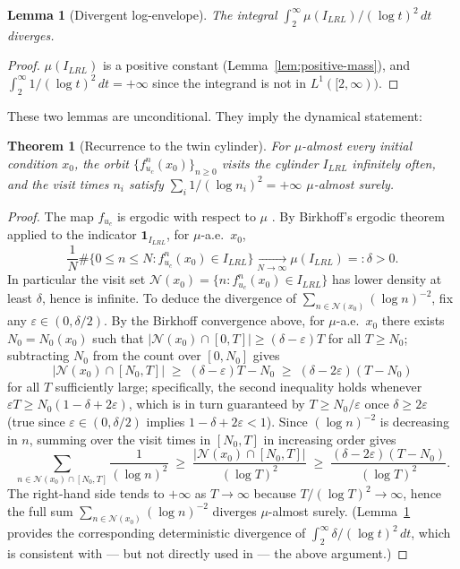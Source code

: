 \documentclass[11pt,a4paper]{article}
\newtheorem{theorem}{Theorem}
\newtheorem{lemma}{Lemma}
\theoremstyle{definition}
\begin{document}
\begin{lemma}[Divergent log-envelope]
\label{lem:divergent-envelope}
The integral $\int_2^\infty \mu(I_{LRL}) / (\log t)^2 \, dt$ diverges.
\end{lemma}
\begin{proof}
$\mu(I_{LRL})$ is a positive constant (Lemma~\ref{lem:positive-mass}),
and $\int_2^\infty 1/(\log t)^2 \, dt = +\infty$ since the integrand is
not in $L^1([2, \infty))$.
\end{proof}

These two lemmas are unconditional. They imply the dynamical statement:

\begin{theorem}[Recurrence to the twin cylinder]
\label{thm:dynamical-recurrence}
For $\mu$-almost every initial condition $x_0$, the orbit
$\{f_{u_c}^n(x_0)\}_{n \geq 0}$ visits the cylinder $I_{LRL}$ infinitely
often, and the visit times $n_i$ satisfy $\sum_i 1/(\log n_i)^2 = +\infty$
$\mu$-almost surely.
\end{theorem}
\begin{proof}
The map $f_{u_c}$ is ergodic with respect to $\mu$
\cite{misiurewicz1981absolutely}. By Birkhoff's ergodic theorem applied
to the indicator $\mathbf{1}_{I_{LRL}}$, for $\mu$-a.e.\ $x_0$,
\[
    \frac{1}{N} \#\{ 0 \leq n \leq N : f_{u_c}^n(x_0) \in I_{LRL} \}
    \xrightarrow[N \to \infty]{} \mu(I_{LRL}) =: \delta > 0.
\]
In particular the visit set
$\mathcal{N}(x_0) = \{ n : f_{u_c}^n(x_0) \in I_{LRL}\}$ has lower
density at least $\delta$, hence is infinite. To deduce the divergence
of $\sum_{n \in \mathcal{N}(x_0)} (\log n)^{-2}$, fix any
$\varepsilon \in (0, \delta/2)$. By the Birkhoff convergence above,
for $\mu$-a.e.\ $x_0$ there exists $N_0 = N_0(x_0)$ such that
$|\mathcal{N}(x_0) \cap [0, T]| \geq (\delta - \varepsilon) T$ for all
$T \geq N_0$; subtracting $N_0$ from the count over $[0, N_0]$ gives
\[
    |\mathcal{N}(x_0) \cap [N_0, T]|
    \;\geq\; (\delta - \varepsilon) T - N_0
    \;\geq\; (\delta - 2\varepsilon)(T - N_0)
\]
for all $T$ sufficiently large; specifically, the second inequality
holds whenever $\varepsilon T \geq N_0 (1 - \delta + 2\varepsilon)$,
which is in turn guaranteed by $T \geq N_0 / \varepsilon$ once
$\delta \geq 2\varepsilon$ (true since
$\varepsilon \in (0, \delta/2)$ implies $1 - \delta + 2\varepsilon < 1$).
Since $(\log n)^{-2}$ is decreasing in $n$, summing over the visit
times in $[N_0, T]$ in increasing order gives
\[
    \sum_{n \in \mathcal{N}(x_0) \cap [N_0, T]} \frac{1}{(\log n)^2}
    \;\geq\; \frac{|\mathcal{N}(x_0) \cap [N_0, T]|}{(\log T)^2}
    \;\geq\; \frac{(\delta - 2\varepsilon)(T - N_0)}{(\log T)^2}.
\]
The right-hand side tends to $+\infty$ as $T \to \infty$ because
$T / (\log T)^2 \to \infty$, hence the full sum
$\sum_{n \in \mathcal{N}(x_0)} (\log n)^{-2}$ diverges $\mu$-almost
surely. (Lemma~\ref{lem:divergent-envelope} provides the corresponding
deterministic divergence of $\int_2^\infty \delta / (\log t)^2 \, dt$,
which is consistent with --- but not directly used in --- the above
argument.)
\end{proof}
\end{document}

